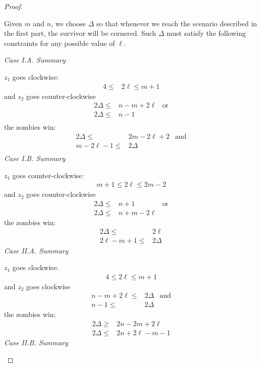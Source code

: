 \begin{proof}
\begin{proofpart}
  Given $m$ and $n$, we choose $\Delta$ so that whenever we reach
  the scenario described in the first part, the survivor will be cornered.
  Such $\Delta$ must satisfy the following constraints for any possible
  value of $\ell$.

  \textit{Case I.A. Summary}

  $z_1$ goes clockwise:
  \begin{align*}
   4 \leq & 2 \ell \leq m + 1
  \end{align*}
  and $z_2$ goes counter-clockwise
  \begin{align*}
   2 \Delta \leq & n - m + 2\ell & \text{or} \\
   2 \Delta \leq & n - 1                     \\
  \end{align*}
  the zombies win:
  \begin{align*}
   2 \Delta \leq      & 2 m- 2 \ell + 2 & \text{and} \\
   m - 2\ell  -1 \leq & 2 \Delta                     \\
  \end{align*}
  \textit{Case I.B. Summary}

  $z_1$ goes counter-clockwise:
  \begin{align*}
   m + 1 \leq 2 \ell \leq 2m - 2
  \end{align*}
  and $z_2$ goes counter-clockwise
  \begin{align*}
   2 \Delta \leq & n + 1         & \text{or} \\
   2 \Delta \leq & n + m - 2\ell
  \end{align*}
  the zombies win:
  \begin{align*}
   2 \Delta \leq      & 2 \ell   \\
   2\ell - m + 1 \leq & 2 \Delta
  \end{align*}
  \textit{Case II.A. Summary}

  $z_1$ goes clockwise:
  \begin{align*}
   4 \leq 2 \ell \leq m + 1
  \end{align*}
  and $z_2$ goes clockwise
  \begin{align*}
   n -m + 2\ell \leq & 2 \Delta & \text{and} \\
   n-1 \leq          & 2 \Delta
  \end{align*}
  the zombies win:
  \begin{align*}
   2 \Delta \geq & 2n - 2m + 2\ell    \\
   2 \Delta \leq & 2n + 2\ell - m - 1
  \end{align*}
  \textit{Case II.B. Summary}


\end{proofpart}
\end{proof}
